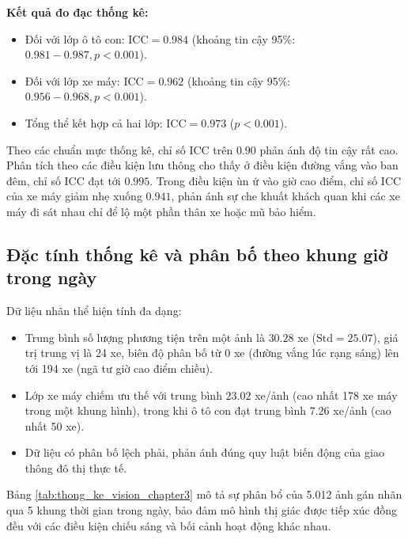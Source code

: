 \textbf{Kết quả đo đạc thống kê:}
\begin{itemize}
    \item Đối với lớp ô tô con: $\text{ICC} = 0.984$ (khoảng tin cậy 95\%: $0.981 - 0.987, p < 0.001$).
    \item Đối với lớp xe máy: $\text{ICC} = 0.962$ (khoảng tin cậy 95\%: $0.956 - 0.968, p < 0.001$).
    \item Tổng thể kết hợp cả hai lớp: $\text{ICC} = 0.973$ ($p < 0.001$).
\end{itemize}
Theo các chuẩn mực thống kê, chỉ số ICC trên $0.90$ phản ánh độ tin cậy rất cao. Phân tích theo các điều kiện lưu thông cho thấy ở điều kiện đường vắng vào ban đêm, chỉ số ICC đạt tới $0.995$. Trong điều kiện ùn ứ vào giờ cao điểm, chỉ số ICC của xe máy giảm nhẹ xuống $0.941$, phản ánh sự che khuất khách quan khi các xe máy đi sát nhau chỉ để lộ một phần thân xe hoặc mũ bảo hiểm.

\subsection{Đặc tính thống kê và phân bố theo khung giờ trong ngày}
Dữ liệu nhãn thể hiện tính đa dạng:
\begin{itemize}
    \item Trung bình số lượng phương tiện trên một ảnh là $30.28$ xe ($\text{Std} = 25.07$), giá trị trung vị là 24 xe, biên độ phân bố từ 0 xe (đường vắng lúc rạng sáng) lên tới 194 xe (ngã tư giờ cao điểm chiều).
    \item Lớp xe máy chiếm ưu thế với trung bình $23.02$ xe/ảnh (cao nhất 178 xe máy trong một khung hình), trong khi ô tô con đạt trung bình $7.26$ xe/ảnh (cao nhất 50 xe).
    \item Dữ liệu có phân bố lệch phải, phản ánh đúng quy luật biến động của giao thông đô thị thực tế.
\end{itemize}

Bảng \ref{tab:thong_ke_vision_chapter3} mô tả sự phân bổ của 5.012 ảnh gán nhãn qua 5 khung thời gian trong ngày, bảo đảm mô hình thị giác được tiếp xúc đồng đều với các điều kiện chiếu sáng và bối cảnh hoạt động khác nhau.

